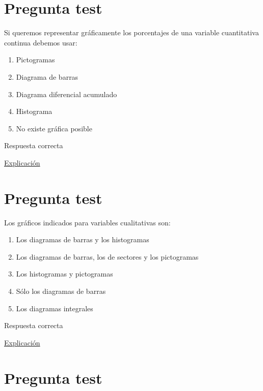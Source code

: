 \documentclass[
]{book}
\providecommand{\tightlist}{%
  \setlength{\itemsep}{0pt}\setlength{\parskip}{0pt}}
\begin{document}
\hypertarget{pregunta-test-55}{%
\section{Pregunta test}\label{pregunta-test-55}}

Si queremos representar gráficamente los porcentajes de una variable cuantitativa continua debemos usar:

\begin{enumerate}
\def\labelenumi{\alph{enumi})}
\tightlist
\item
  Pictogramas
\item
  Diagrama de barras
\item
  Diagrama diferencial acumulado
\item
  Histograma
\item
  No existe gráfica posible
\end{enumerate}

Respuesta correcta

\href{https://1fjmanzano.github.io/bioestadistica/histogramas.html}{Explicación}

\hypertarget{pregunta-test-56}{%
\section{Pregunta test}\label{pregunta-test-56}}

Los gráficos indicados para variables cualitativas son:

\begin{enumerate}
\def\labelenumi{\alph{enumi})}
\tightlist
\item
  Los diagramas de barras y los histogramas
\item
  Los diagramas de barras, los de sectores y los pictogramas
\item
  Los histogramas y pictogramas
\item
  Sólo los diagramas de barras
\item
  Los diagramas integrales
\end{enumerate}

Respuesta correcta

\href{https://1fjmanzano.github.io/bioestadistica/diagramas-de-barras-y-sectores.html}{Explicación}

\hypertarget{pregunta-test-57}{%
\section{Pregunta test}\label{pregunta-test-57}}
\end{document}
